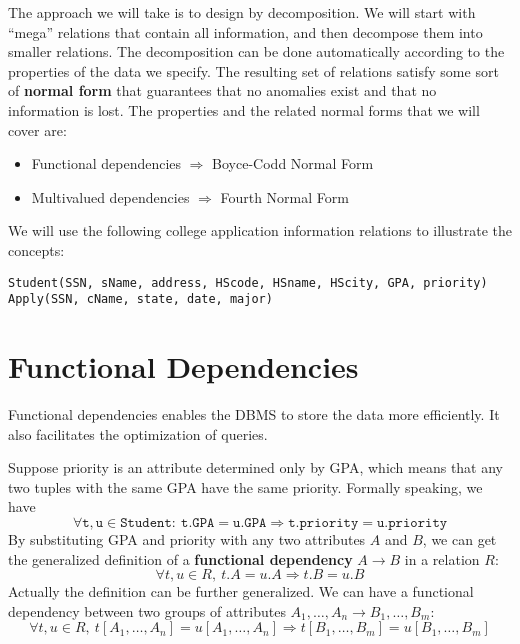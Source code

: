 The approach we will take is to design by decomposition. We will start with ``mega'' relations that contain all information, and then decompose them into smaller relations. The decomposition can be done automatically according to the properties of the data we specify. The resulting set of relations satisfy some sort of \textbf{normal form} that guarantees that no anomalies exist and that no information is lost. The properties and the related normal forms that we will cover are:
\begin{itemize}
\item Functional dependencies $\Rightarrow$ Boyce-Codd Normal Form
\item Multivalued dependencies $\Rightarrow$ Fourth Normal Form
\end{itemize}
 We will use the following college application information relations to illustrate the concepts:
\begin{lstlisting}
Student(SSN, sName, address, HScode, HSname, HScity, GPA, priority)
Apply(SSN, cName, state, date, major)
\end{lstlisting}
\section{Functional Dependencies}
Functional dependencies enables the DBMS to store the data more efficiently. It also facilitates the optimization of queries.

Suppose priority is an attribute determined only by GPA, which means that any two tuples with the same GPA have the same priority. Formally speaking, we have
\begin{equation*}
\mathtt{\forall t,u \in Student:\:t.GPA = u.GPA\Rightarrow t.priority=u.priority}
\end{equation*}
By substituting GPA and priority with any two attributes $A$ and $B$, we can get the generalized definition of a \textbf{functional dependency}  $A\rightarrow B$ in a relation $R$: 
\begin{equation*}
\forall t,u \in R,\:t.A = u.A\Rightarrow t.B=u.B
\end{equation*}
Actually the definition can be further generalized. We can have a functional dependency between two groups of attributes ${A_1,\dots,A_n\rightarrow B_1,\dots,B_m}$:
\begin{equation*}
\forall t,u \in R,\:t[A_1,\dots,A_n] = u[A_1,\dots,A_n]\Rightarrow t[B_1,\dots,B_m]=u[B_1,\dots,B_m]
\end{equation*}

